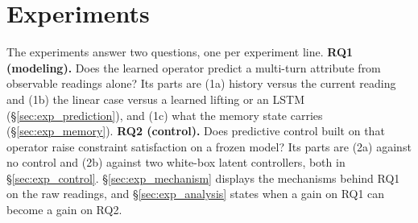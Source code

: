 \section{Experiments}
\label{sec:exp}
The experiments answer two questions, one per experiment line.
\textbf{RQ1 (modeling).} Does the learned operator predict a multi-turn attribute from observable readings alone?
Its parts are (1a) history versus the current reading and (1b) the linear case versus a learned lifting or an LSTM (\S\ref{sec:exp_prediction}), and (1c) what the memory state carries (\S\ref{sec:exp_memory}).
\textbf{RQ2 (control).} Does predictive control built on that operator raise constraint satisfaction on a frozen model?
Its parts are (2a) against no control and (2b) against two white-box latent controllers, both in \S\ref{sec:exp_control}.
\S\ref{sec:exp_mechanism} displays the mechanisms behind RQ1 on the raw readings, and \S\ref{sec:exp_analysis} states when a gain on RQ1 can become a gain on RQ2.







